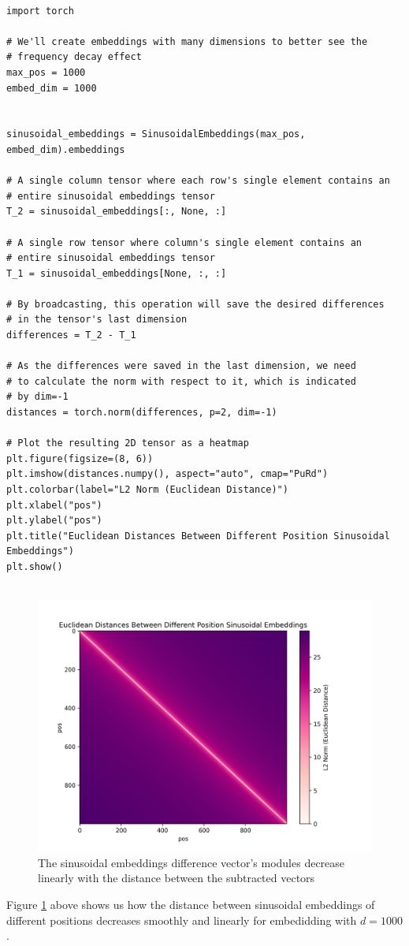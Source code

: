 \documentclass{article}
\begin{document}
\begin{lstlisting}[caption={Generating the plot of the module of the difference between every two different positions sinusoidal embeddings}]
	
import torch

# We'll create embeddings with many dimensions to better see the 
# frequency decay effect
max_pos = 1000
embed_dim = 1000


sinusoidal_embeddings = SinusoidalEmbeddings(max_pos, embed_dim).embeddings

# A single column tensor where each row's single element contains an 
# entire sinusoidal embeddings tensor
T_2 = sinusoidal_embeddings[:, None, :]

# A single row tensor where column's single element contains an 
# entire sinusoidal embeddings tensor
T_1 = sinusoidal_embeddings[None, :, :]

# By broadcasting, this operation will save the desired differences
# in the tensor's last dimension
differences = T_2 - T_1

# As the differences were saved in the last dimension, we need 
# to calculate the norm with respect to it, which is indicated 
# by dim=-1
distances = torch.norm(differences, p=2, dim=-1)

# Plot the resulting 2D tensor as a heatmap
plt.figure(figsize=(8, 6))
plt.imshow(distances.numpy(), aspect="auto", cmap="PuRd")
plt.colorbar(label="L2 Norm (Euclidean Distance)")
plt.xlabel("pos")
plt.ylabel("pos")
plt.title("Euclidean Distances Between Different Position Sinusoidal Embeddings")
plt.show()


\end{lstlisting}

\begin{figure}[h]
	\centering
	\includegraphics[width=\linewidth]{images/sin_embeds_scale_invariance.png}
	\caption{The sinusoidal embeddings difference vector's modules decrease linearly with the distance between the subtracted vectors}
	\label{fig:sin_embeds_scale_invariance}
\end{figure}

Figure \ref{fig:sin_embeds_scale_invariance} above shows us how the distance between sinusoidal embeddings of different positions decreases smoothly and linearly for embedidding with $d = 1000$.

\end{document}
